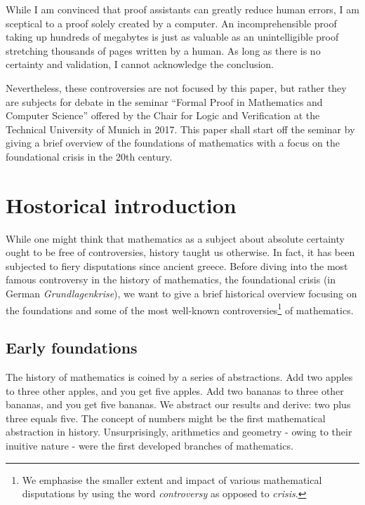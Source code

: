 \documentclass[hidelinks]{article}
\theoremstyle{plain}
\theoremstyle{definition}
\theoremstyle{rem}
\begin{document}
While I am convinced that proof assistants can greatly reduce human errors, I am sceptical to a proof solely created by a computer. An incomprehensible proof taking up hundreds of megabytes is just as valuable as an unintelligible proof stretching thousands of pages written by a human. As long as there is no certainty and validation, I cannot acknowledge the conclusion.

Nevertheless, these controversies are not focused by this paper, but rather they are subjects for debate in the seminar ``Formal Proof in Mathematics and Computer Science'' offered by the Chair for Logic and Verification at the Technical University of Munich in 2017. This paper shall start off the seminar by giving a brief overview of the foundations of mathematics with a focus on the foundational crisis in the 20th century.
\newpage

\tableofcontents 
\listoffigures 
\listoftables 
\newpage

\section{Hostorical introduction}
While one might think that mathematics as a subject about absolute certainty ought to be free of controversies, history taught us otherwise. In fact, it has been subjected to fiery disputations since ancient greece. Before diving into the most famous controversy in the history of mathematics, the foundational crisis (in German \textit{Grundlagenkrise}), we want to give a brief historical overview focusing on the foundations and some of the most well-known controversies\footnote{We emphasise the smaller extent and impact of various mathematical disputations by using the word \textit{controversy} as opposed to \textit{crisis}.} of mathematics.

\subsection{Early foundations}

The history of mathematics is coined by a series of abstractions.
Add two apples to three other apples, and you get five apples. Add two bananas to three other bananas, and you get five bananas. We abstract our results and derive: two plus three equals five. The concept of numbers might be the first mathematical abstraction in history. Unsurprisingly, arithmetics and geometry - owing to their inuitive nature - were the first developed branches of mathematics.
\end{document}
